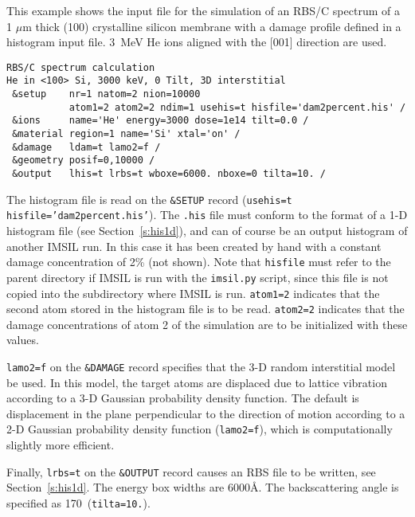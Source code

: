 This example shows the input file for the simulation of an RBS/C spectrum
of a 1 $\mu$m thick (100) crystalline silicon membrane with a damage profile
defined in a histogram input file. 3~MeV He ions aligned with the [001]
direction are used.

\begin{verbatim}
RBS/C spectrum calculation  
He in <100> Si, 3000 keV, 0 Tilt, 3D interstitial
 &setup    nr=1 natom=2 nion=10000 
           atom1=2 atom2=2 ndim=1 usehis=t hisfile='dam2percent.his' /  
 &ions     name='He' energy=3000 dose=1e14 tilt=0.0 /
 &material region=1 name='Si' xtal='on' /
 &damage   ldam=t lamo2=f /
 &geometry posif=0,10000 /
 &output   lhis=t lrbs=t wboxe=6000. nboxe=0 tilta=10. / 
\end{verbatim}

The histogram file is read on the \texttt{\&SETUP} record (\texttt{usehis=t
hisfile='dam2percent.his'}). The \texttt{.his} file must conform to the format
of a 1-D histogram file (see Section~\ref{s:his1d}), and can of course be an
output histogram of another IMSIL run. In this case it has been created by hand
with a constant damage concentration of 2\% (not shown). Note that
\texttt{hisfile} must refer to the parent directory if IMSIL is run with the
\texttt{imsil.py} script, since this file is not copied into the subdirectory
where IMSIL is run. \texttt{atom1=2} indicates that the second atom stored in
the histogram file is to be read. \texttt{atom2=2} indicates that the damage
concentrations of atom 2 of the simulation are to be initialized with these
values.

\texttt{lamo2=f} on the \texttt{\&DAMAGE} record specifies that the 3-D random
interstitial model be used. In this model, the target atoms are displaced due to
lattice vibration according to a 3-D Gaussian probability density function. The
default is displacement in the plane perpendicular to the direction of motion
according to a 2-D Gaussian probability density function (\texttt{lamo2=f}),
which is computationally slightly more efficient.

Finally, \texttt{lrbs=t} on the \texttt{\&OUTPUT} record causes an RBS file to
be written, see Section~\ref{s:his1d}. The energy box widths are 6000\AA. The
backscattering angle is specified as 170\textdegree\ (\texttt{tilta=10.}).
